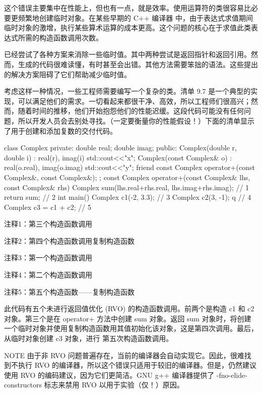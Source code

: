 这个错误主要集中在性能上，但也有一点，就是效率。使用运算符的类很容易比必要更频繁地创建临时对象。在某些早期的 C++ 编译器 中，由于表达式求值期间临时对象的激增，执行某些算术运算的成本更高。这个问题的核心在于求值此类表达式所需的构造函数调用次数。

已经尝试了各种方案来消除一些临时值。其中两种尝试是返回指针和返回引用。然而，生成的代码很难读懂，有时甚至会出错。其他方法需要笨拙的语法。这些提出的解决方案阻碍了它们帮助减少临时值。


考虑这样一种情况，一些工程师需要编写一个复杂的类。清单 9.7 是一个典型的实现，可以满足他们的需求。一切看起来都很干净、高效，所以工程师们很高兴；然而，随着时间的推移，他们开始抱怨他们的性能迟缓。这段代码可能没有任何问题，所以开发人员会去别处寻找。（一定要衡量你的性能假设！）下面的清单显示了用于创建和添加复数的交付代码。


\begin{cpp}
class Complex {
private:
  double real;
  double imag;
public:
  Complex(double r, double i) : real(r), imag(i) {std::cout<<"x\n";}
  Complex(const Complex& o) : real(o.real), imag(o.imag)
    { std::cout<<"y\n"; }
  friend const Complex operator+(const Complex&, const Complex&);
};
const Complex operator+(const Complex& lhs, const Complex& rhs) {
  Complex sum(lhs.real+rhs.real, lhs.imag+rhs.imag); // 1
  return sum; // 2
}
int main() {
  Complex c1(-2, 3.3); // 3
  Complex c2(3, -1); q // 4
  Complex c3 = c1 + c2; // 5
}
\end{cpp}

{\footnotesize
注释1：第三个构造函数调用

注释2：第四个构造函数调用复制构造函数

注释3：第一个构造函数调用

注释4：第二个构造函数调用

注释5：第五个构造函数——复制构造函数
}

此代码有五个未进行返回值优化 (RVO) 的构造函数调用。前两个是构造 c1 和 c2 对象。第三个是在 operator+ 方法中创建 sum 对象。返回 sum 对象时，将创建一个临时对象并使用复制构造函数用其值初始化该对象，这是第四次调用。最后，从临时对象创建 c3 对象，进行 第五次构造函数调用。

\begin{myNotic}{NOTE}
由于非 RVO 问题普遍存在，当前的编译器会自动实现它。因此，很难找到不执行 RVO 的编译器，所以这个错误只适用于较旧的编译器。但是，仍然建议使用 RVO 的编码建议，因为它们更简洁。GNU g++ 编译器提供了 -fno-elide-constructors 标志来禁用 RVO 以用于实验（仅！）原因。
\end{myNotic}


